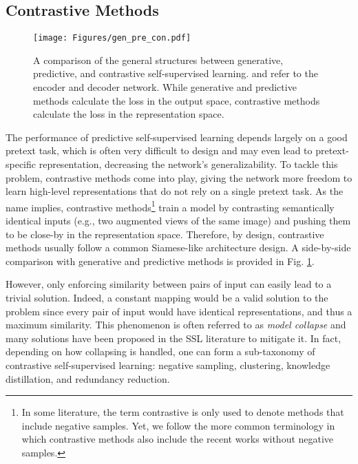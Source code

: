 \documentclass[lettersize,journal]{IEEEtran}
\begin{document}
\subsection{Contrastive Methods}
\label{sec:ContrastiveMethods}

\begin{figure}
\centering
\texttt{[image: Figures/gen\_pre\_con.pdf]}
\caption[GPC]{A comparison of the general structures between generative, predictive, and contrastive self-supervised learning.  and  refer to the encoder and decoder network. While generative and predictive methods calculate the loss in the output space, contrastive methods calculate the loss in the representation space.}
\label{fig:GPC}
\end{figure}

The performance of predictive self-supervised learning depends largely on a good pretext task, which is often very difficult to design and may even lead to pretext-specific representation, decreasing the network's generalizability. To tackle this problem, contrastive methods come into play, giving the network more freedom to learn high-level representations that do not rely on a single pretext task. As the name implies, contrastive methods\footnote{In some literature, the term contrastive is only used to denote methods that include negative samples. Yet, we follow the more common terminology in which contrastive methods also include the recent works without negative samples.} train a model by contrasting semantically identical inputs (e.g., two augmented views of the same image) and pushing them to be close-by in the representation space. Therefore, by design, contrastive methods usually follow a common Siamese-like architecture design. A side-by-side comparison with generative and predictive methods is provided in Fig. \ref{fig:GPC}.

However, only enforcing similarity between pairs of input can easily lead to a trivial solution. Indeed, a constant mapping would be a valid solution to the problem since every pair of input would have identical representations, and thus a maximum similarity. This phenomenon is often referred to as \textit{model collapse} and many solutions have been proposed in the SSL literature to mitigate it. In fact, depending on how collapsing is handled, one can form a sub-taxonomy of contrastive self-supervised learning: negative sampling, clustering, knowledge distillation, and redundancy reduction.
\end{document}
